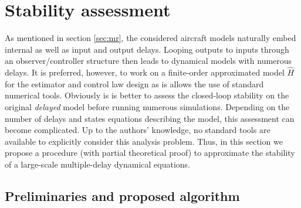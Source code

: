 \documentclass[graybox]{svmult}
\begin{document}
\section{Stability assessment}\label{sec:st}

As mentioned in section \ref{sec:mr}, the considered aircraft models naturally embed internal as well as input and output delays. Looping outputs to inputs through an observer/controller structure then leads to dynamical models with  numerous delays. It is preferred, however, to work on a finite-order approximated model $\hat H$ for the estimator and control law design as is allows the use of standard numerical tools. Obviously is is better to assess the closed-loop stability on the original \textit{delayed} model before running numerous simulations.
Depending on the number of delays and states equations describing the model, this assessment can become complicated. Up to the authors' knowledge, no  standard tools are available to explicitly consider this analysis problem. Thus, in this section we propose a procedure (with partial theoretical proof) to approximate the stability of a large-scale multiple-delay dynamical equations. 

\subsection{Preliminaries and proposed algorithm }
\end{document}
